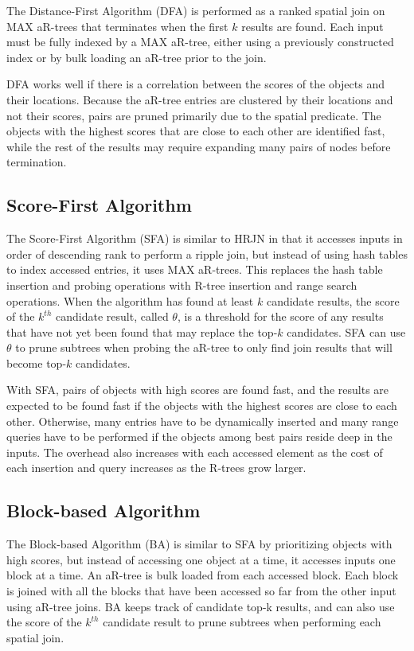The Distance-First Algorithm (DFA) is performed as a ranked spatial join on MAX aR-trees that terminates when the first \(k\) results are found. Each input must be fully indexed by a MAX aR-tree, either using a previously constructed index or by bulk loading an aR-tree prior to the join.

DFA works well if there is a correlation between the scores of the objects and their locations. Because the aR-tree entries are clustered by their locations and not their scores, pairs are pruned primarily due to the spatial predicate. The objects with the highest scores that are close to each other are identified fast, while the rest of the results may require expanding many pairs of nodes before termination.

\subsection{Score-First Algorithm}

The Score-First Algorithm (SFA) is similar to HRJN in that it accesses inputs in order of descending rank to perform a ripple join, but instead of using hash tables to index accessed entries, it uses MAX aR-trees. This replaces the hash table insertion and probing operations with R-tree insertion and range search operations. When the algorithm has found at least \(k\) candidate results, the score of the \(k^{th}\) candidate result, called \(\theta\), is a threshold for the score of any results that have not yet been found that may replace the top-\(k\) candidates. SFA can use \(\theta\) to prune subtrees when probing the aR-tree to only find join results that will become top-\(k\) candidates.

With SFA, pairs of objects with high scores are found fast, and the results are expected to be found fast if the objects with the highest scores are close to each other. Otherwise, many entries have to be dynamically inserted and many range queries have to be performed if the objects among best pairs reside deep in the inputs. The overhead also increases with each accessed element as the cost of each insertion and query increases as the R-trees grow larger.

\subsection{Block-based Algorithm}

The Block-based Algorithm (BA) is similar to SFA by prioritizing objects with high scores, but instead of accessing one object at a time, it accesses inputs one block at a time. An aR-tree is bulk loaded from each accessed block. Each block is joined with all the blocks that have been accessed so far from the other input using aR-tree joins. BA keeps track of candidate top-k results, and can also use the score of the \(k^{th}\) candidate result to prune subtrees when performing each spatial join.

